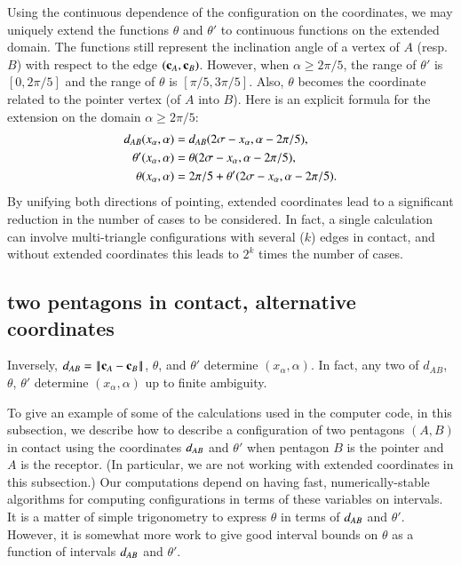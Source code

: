 Using the continuous dependence of the configuration on the
coordinates, we may uniquely extend the functions $\theta$ and
$\theta'$ to continuous functions on the extended domain.  The
functions still represent the inclination angle of a vertex of $A$
(resp. $B$) with respect to the edge $({\mathbf c}_A,{\mathbf c}_B)$.  However, when
$\alpha\ge 2\pi/5$, the range of $\theta'$ is $[0,2\pi/5]$ and the
range of $\theta$ is $[\pi/5,3\pi/5]$.  Also, $\theta$ becomes
the coordinate related to the pointer vertex (of $A$ into $B$).
Here is an explicit formula
for the extension on the domain $\alpha\ge 2\pi/5$:
\begin{align*}
d_{AB}(x_\alpha,\alpha) &=d_{AB}(2\sigma-x_\alpha,\alpha-2\pi/5),\\
\theta'(x_\alpha,\alpha) 
&= \theta(2\sigma-x_\alpha,\alpha-2\pi/5),\\
\theta(x_\alpha,\alpha) 
&= 2\pi/5+ \theta'(2\sigma-x_\alpha,\alpha-2\pi/5).
\end{align*}
By unifying both directions of pointing, extended coordinates lead to
a significant reduction in the number of cases to be considered.  In
fact, a single calculation can involve multi-triangle configurations
with several ($k$) edges in contact, and without extended coordinates
this leads to $2^k$ times the number of cases.




\subsection{two pentagons in contact, alternative
  coordinates}

Inversely, $d_{AB} = \norm{\c_A}{\c_B}$, $\theta$, and $\theta'$
determine $(x_\alpha,\alpha)$.  In fact, any two of $d_{AB}$, $\theta$, $\theta'$
determine $(x_\alpha,\alpha)$ up to finite ambiguity.


To give an example of some of the calculations used in the computer code,
in this subsection, we describe how to describe a configuration of two
pentagons $(A,B)$ in contact using the coordinates $d_{AB}$ and
$\theta'$ when pentagon $B$ is the pointer and $A$ is the
receptor.  (In particular, we are not working with extended
coordinates in this subsection.)  Our computations depend on having
fast, numerically-stable algorithms for computing configurations in
terms of these variables on intervals.  It is a matter of simple
trigonometry to express $\theta$ in terms of $d_{AB}$ and
$\theta'$.  However, it is somewhat more work to give good
interval bounds on $\theta$ as a function of intervals
$d_{AB}$ and $\theta'$.

